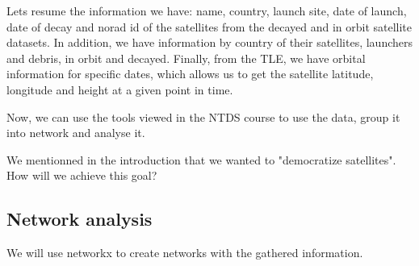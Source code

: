 \documentclass[11pt,letterpaper]{article}
\begin{document}
Lets resume the information we have: name, country, launch site, date of launch, date of decay and norad id of the satellites from the decayed and in orbit satellite datasets. 
In addition, we have information by country of their satellites, launchers and debris, in orbit and decayed.
Finally, from the TLE, we have orbital information for specific dates, which allows us to get the satellite latitude, longitude and height at a given point in time.

Now, we can use the tools viewed in the NTDS course to use the data, group it into network and analyse it.

We mentionned in the introduction that we wanted to "democratize satellites". How will we achieve this goal?


\subsection{Network analysis}

We will use networkx to create networks with the gathered information.
\end{document}
